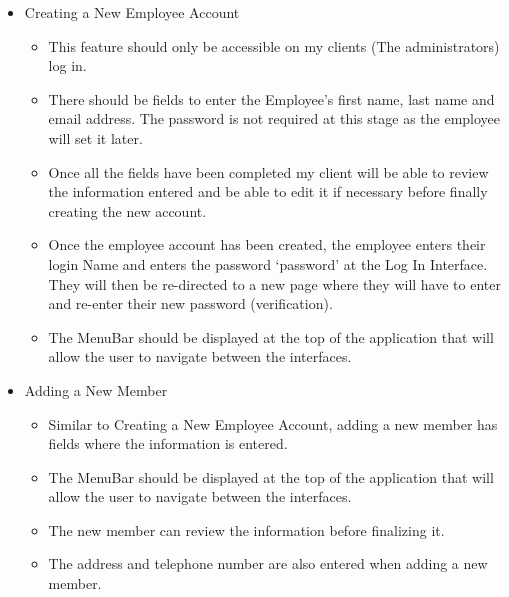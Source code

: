 \begin{itemize}
	\item Creating a New Employee Account
	\begin{itemize}
		\item This feature should only be accessible on my clients (The administrators) log in.
		\item There should be fields to enter the Employee's first name, last name and email address. The password is not required at this stage as the employee will set it later.
		\item Once all the fields have been completed my client will be able to review the information entered and be able to edit it if necessary before finally creating the new account.
		\item Once the employee account has been created, the employee enters their login Name and enters the password ‘password’ at the Log In Interface. They will then be re-directed to a new page where they will have to enter and re-enter their new password (verification).
		\item The MenuBar should be displayed at the top of the application that will allow the user to navigate between the interfaces. 
	\end{itemize}

\pagebreak

	\item Adding a New Member
	\begin{itemize}
		\item Similar to Creating a New Employee Account, adding a new member has fields where the information is entered.
		\item The MenuBar should be displayed at the top of the application that will allow the user to navigate between the interfaces.
		\item The new member can review the information before finalizing it.
		\item The address and telephone number are also entered when adding a new member.
	\end{itemize}


\end{itemize}

